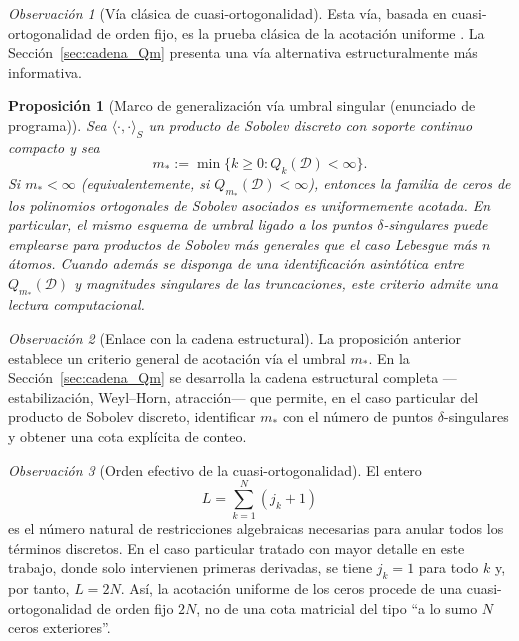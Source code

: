\documentclass[12pt,a4paper]{article}
\newtheorem{proposition}{Proposición}
\theoremstyle{definition}
\theoremstyle{remark}
\newtheorem{remark}{Observación}
\newcommand{\D}{\mathcal{D}}
\begin{document}
\begin{remark}[Vía clásica de cuasi-ortogonalidad]\label{rem:via_clasica}
  Esta vía, basada en cuasi-ortogonalidad de orden fijo, es la prueba clásica de la acotación uniforme \cite{lopez1999zero,marcellan2015sobolev}. La Sección~\ref{sec:cadena_Qm} presenta una vía alternativa estructuralmente más informativa.
\end{remark}

\begin{proposition}[Marco de generalización vía umbral singular (enunciado de programa)]\label{prop:marco_generalizacion_umbral_singular}
  Sea $\langle\cdot,\cdot\rangle_S$ un producto de Sobolev discreto con soporte continuo compacto y sea
  \[
    m_*:=\min\{k\ge 0: Q_k(\D)<\infty\}.
  \]
  Si $m_*<\infty$ (equivalentemente, si $Q_{m_*}(\D)<\infty$),
  entonces la familia de ceros de los polinomios ortogonales de Sobolev asociados es uniformemente acotada.
  En particular, el mismo esquema de umbral ligado a los puntos $\delta$-singulares puede emplearse para productos de Sobolev más generales que el caso Lebesgue más $n$ átomos.
  Cuando además se disponga de una identificación asintótica entre $Q_{m_*}(\D)$ y magnitudes singulares de las truncaciones, este criterio admite una lectura computacional.
\end{proposition}

\begin{remark}[Enlace con la cadena estructural]\label{rem:enlace_marco_Qm}
  La proposición anterior establece un criterio general de acotación vía el umbral $m_*$. En la Sección~\ref{sec:cadena_Qm} se desarrolla la cadena estructural completa ---estabilización, Weyl--Horn, atracción--- que permite, en el caso particular del producto de Sobolev discreto, identificar $m_*$ con el número de puntos $\delta$-singulares y obtener una cota explícita de conteo.
\end{remark}

\begin{remark}[Orden efectivo de la cuasi-ortogonalidad]
  El entero
  \[
    L = \sum_{k=1}^N (j_k+1)
  \]
  es el número natural de restricciones algebraicas necesarias para anular todos los términos discretos. En el caso particular tratado con mayor detalle en este trabajo, donde solo intervienen primeras derivadas, se tiene $j_k=1$ para todo $k$ y, por tanto, $L=2N$. Así, la acotación uniforme de los ceros procede de una cuasi-ortogonalidad de orden fijo $2N$, no de una cota matricial del tipo ``a lo sumo $N$ ceros exteriores''.
\end{remark}
\end{document}
